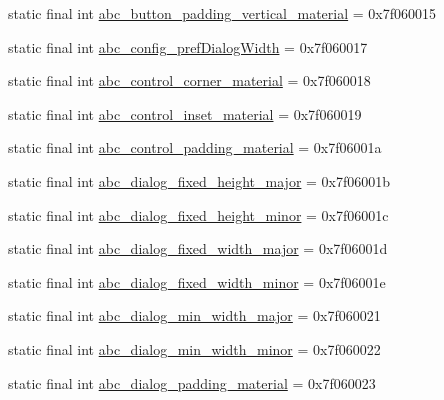 \begin{DoxyCompactItemize}
\item 
static final int \mbox{\hyperlink{classcom_1_1google_1_1android_1_1gms_1_1R_1_1dimen_a3902a5fdd4515b31e1daf0f202f56c26}{abc\+\_\+button\+\_\+padding\+\_\+vertical\+\_\+material}} = 0x7f060015
\item 
static final int \mbox{\hyperlink{classcom_1_1google_1_1android_1_1gms_1_1R_1_1dimen_ac70bb69f77dae84db0a34aa471c7827c}{abc\+\_\+config\+\_\+pref\+Dialog\+Width}} = 0x7f060017
\item 
static final int \mbox{\hyperlink{classcom_1_1google_1_1android_1_1gms_1_1R_1_1dimen_a2809a11c0dd37b8a8abadbc5cb1569f6}{abc\+\_\+control\+\_\+corner\+\_\+material}} = 0x7f060018
\item 
static final int \mbox{\hyperlink{classcom_1_1google_1_1android_1_1gms_1_1R_1_1dimen_ac6caa77a7ae5cb996c31a35dfc148978}{abc\+\_\+control\+\_\+inset\+\_\+material}} = 0x7f060019
\item 
static final int \mbox{\hyperlink{classcom_1_1google_1_1android_1_1gms_1_1R_1_1dimen_a69fe587ad576bd001311944defc04935}{abc\+\_\+control\+\_\+padding\+\_\+material}} = 0x7f06001a
\item 
static final int \mbox{\hyperlink{classcom_1_1google_1_1android_1_1gms_1_1R_1_1dimen_a9ac01a05c724fe784ad7402ab96a3482}{abc\+\_\+dialog\+\_\+fixed\+\_\+height\+\_\+major}} = 0x7f06001b
\item 
static final int \mbox{\hyperlink{classcom_1_1google_1_1android_1_1gms_1_1R_1_1dimen_aa27d400d4b1fba60784d4333471cb6fc}{abc\+\_\+dialog\+\_\+fixed\+\_\+height\+\_\+minor}} = 0x7f06001c
\item 
static final int \mbox{\hyperlink{classcom_1_1google_1_1android_1_1gms_1_1R_1_1dimen_a6b28220062af6ebc98f7558e178f25b5}{abc\+\_\+dialog\+\_\+fixed\+\_\+width\+\_\+major}} = 0x7f06001d
\item 
static final int \mbox{\hyperlink{classcom_1_1google_1_1android_1_1gms_1_1R_1_1dimen_a2a21b78c97546a46b6c6bb417054ca09}{abc\+\_\+dialog\+\_\+fixed\+\_\+width\+\_\+minor}} = 0x7f06001e
\item 
static final int \mbox{\hyperlink{classcom_1_1google_1_1android_1_1gms_1_1R_1_1dimen_a9feea95f1cb9965cd89494dfe74ad73c}{abc\+\_\+dialog\+\_\+min\+\_\+width\+\_\+major}} = 0x7f060021
\item 
static final int \mbox{\hyperlink{classcom_1_1google_1_1android_1_1gms_1_1R_1_1dimen_aa2656637e5871258c0472e4179f92ac4}{abc\+\_\+dialog\+\_\+min\+\_\+width\+\_\+minor}} = 0x7f060022
\item 
static final int \mbox{\hyperlink{classcom_1_1google_1_1android_1_1gms_1_1R_1_1dimen_a020907af1b70a97340f8c94ca5736abe}{abc\+\_\+dialog\+\_\+padding\+\_\+material}} = 0x7f060023

\end{DoxyCompactItemize}
